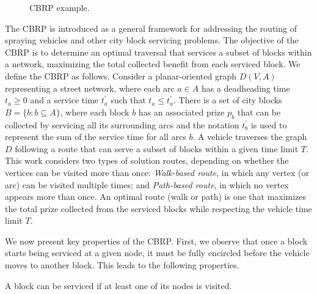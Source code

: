 \begin{figure}[h!]
  \begin{minipage}[c]{.49\textwidth}
    \centering
  \end{minipage}%
  \begin{minipage}[c]{.49\textwidth}
    \centering
  \end{minipage}
  \caption{\label{fig:route-ex} CBRP example.}
\end{figure}

The CBRP is introduced as a general framework for addressing the routing of spraying vehicles and other city block servicing problems. The objective of the CBRP is to determine an optimal traversal that services a subset of blocks within a network, maximizing the total collected benefit from each serviced block. We define the CBRP as follows. Consider a planar-oriented graph $D(V,A)$ representing a street network, where each arc $a \in A$ has a deadheading time $t_a \geqslant 0$ and a service time $t^{'}_a$ such that $t_a \leqslant t^{'}_a$. There is a set of city blocks $B = \{b : b \subseteq A\}$, where each block $b$ has an associated prize $p_b$ that can be collected by servicing all its surrounding arcs and the notation $t^{'}_b$ is used to represent the sum of the service time for all arcs $b$. A vehicle traverses the graph $D$ following a route that can serve a subset of blocks within a given time limit $T$. This work considers two types of solution routes, depending on whether the vertices can be visited more than once: \textit{Walk-based route}, in which any vertex (or arc) can be visited multiple times; and \textit{Path-based route}, in which no vertex appears more than once. An optimal route (walk or path) is one that maximizes the total prize collected from the serviced blocks while respecting the vehicle time limit $T$.

We now present key properties of the CBRP. First, we observe that once a block starts being serviced at a given node, it must be fully encircled before the vehicle moves to another block. This leads to the following properties.

\begin{property}
\label{claim:core_insight}
A block can be serviced if at least one of its nodes is visited.
\end{property}

